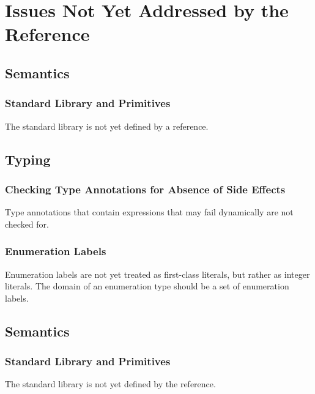 
\chapter{Issues Not Yet Addressed by the Reference\label{appendix:MissingTransliteration}}
\section{Semantics}

\subsection{Standard Library and Primitives}

The standard library is not yet defined by a reference.


\section{Typing}

\subsection{Checking Type Annotations for Absence of Side Effects}
Type annotations that contain expressions that may fail dynamically are not checked for.

\subsection{Enumeration Labels}
Enumeration labels are not yet treated as first-class literals, but rather as integer literals.
The domain of an enumeration type should be a set of enumeration labels.



\section{Semantics}

\subsection{Standard Library and Primitives}

The standard library is not yet defined by the reference.

